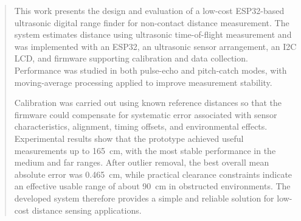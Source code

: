 \begin{abstract}
This work presents the design and evaluation of a low-cost ESP32-based
ultrasonic digital range finder for non-contact distance measurement.
The system estimates distance using ultrasonic time-of-flight
measurement and was implemented with an ESP32, an ultrasonic sensor
arrangement, an I2C LCD, and firmware supporting calibration and data
collection. Performance was studied in both pulse-echo and pitch-catch
modes, with moving-average processing applied to improve measurement
stability.

Calibration was carried out using known reference distances so that the
firmware could compensate for systematic error associated with sensor
characteristics, alignment, timing offsets, and environmental effects.
Experimental results show that the prototype achieved useful
measurements up to 165~cm, with the most stable performance in the
medium and far ranges. After outlier removal, the best overall mean
absolute error was 0.465~cm, while practical clearance constraints
indicate an effective usable range of about 90~cm in obstructed
environments. The developed system therefore provides a simple and
reliable solution for low-cost distance sensing applications.
\end{abstract}
